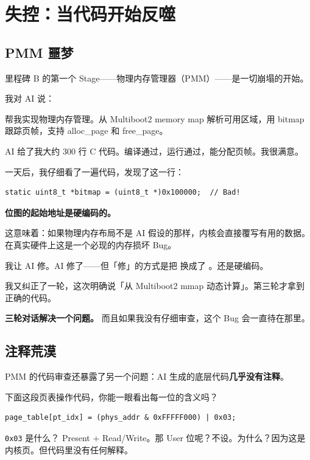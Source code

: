 \chapter{失控：当代码开始反噬}

\section{PMM 噩梦}

里程碑 B 的第一个 Stage——物理内存管理器（PMM）——是一切崩塌的开始。

我对 AI 说：

\begin{humanmsg}
帮我实现物理内存管理。从 Multiboot2 memory map 解析可用区域，用 bitmap 跟踪页帧，支持 alloc\_page 和 free\_page。
\end{humanmsg}

AI 给了我大约 300 行 C 代码。编译通过，运行通过，能分配页帧。我很满意。

一天后，我仔细看了一遍代码，发现了这一行：

\begin{lstlisting}[style=cstyle]
static uint8_t *bitmap = (uint8_t *)0x100000;  // Bad!
\end{lstlisting}

\textbf{位图的起始地址是硬编码的。}

这意味着：如果物理内存布局不是 AI 假设的那样，内核会直接覆写有用的数据。在真实硬件上这是一个必现的内存损坏 Bug。

我让 AI 修。AI 修了——但「修」的方式是把  换成了 。还是硬编码。

我又纠正了一轮，这次明确说「从 Multiboot2 mmap 动态计算」。第三轮才拿到正确的代码。

\textbf{三轮对话解决一个问题。} 而且如果我没有仔细审查，这个 Bug 会一直待在那里。

\section{注释荒漠}

PMM 的代码审查还暴露了另一个问题：AI 生成的底层代码\textbf{几乎没有注释}。

下面这段页表操作代码，你能一眼看出每一位的含义吗？

\begin{lstlisting}[style=cstyle]
page_table[pt_idx] = (phys_addr & 0xFFFFF000) | 0x03;
\end{lstlisting}

\texttt{0x03} 是什么？ Present + Read/Write。那 User 位呢？不设。为什么？因为这是内核页。但代码里没有任何解释。

